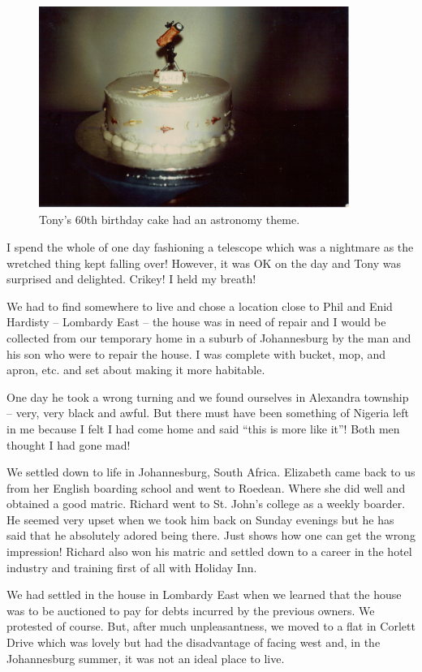 \begin{figure}
  \centering
  \includegraphics[width=0.9\textwidth]{photos/cake-astronomy}
  \caption{Tony's 60th birthday cake had an astronomy theme.}
  \label{cake-astronomy}
\end{figure}

I spend the whole of one day fashioning a telescope which was a
nightmare as the wretched thing kept falling over! However, it was OK
on the day and Tony was surprised and delighted. Crikey! I held my
breath!

We had to find somewhere to live and chose a location close to Phil
and Enid Hardisty -- Lombardy East -- the house was in need of repair
and I would be collected from our temporary home in a suburb of
Johannesburg by the man and his son who were to repair the house. I
was complete with bucket, mop, and apron, etc. and set about making it
more habitable.

One day he took a wrong turning and we found ourselves in Alexandra
township -- very, very black and awful. But there must have been
something of Nigeria left in me because I felt I had come home and
said ``this is more like it''! Both men thought I had gone mad!

We settled down to life in Johannesburg, South Africa. Elizabeth came
back to us from her English boarding school and went to Roedean. Where
she did well and obtained a good matric. Richard went to St. John's
college as a weekly boarder. He seemed very upset when we took him
back on Sunday evenings but he has said that he absolutely adored
being there. Just shows how one can get the wrong impression! Richard
also won his matric and settled down to a career in the hotel industry
and training first of all with Holiday Inn.

We had settled in the house in Lombardy East when we learned that the
house was to be auctioned to pay for debts incurred by the previous
owners. We protested of course. But, after much unpleasantness, we
moved to a flat in Corlett Drive which was lovely but had the
disadvantage of facing west and, in the Johannesburg summer, it was
not an ideal place to live.

